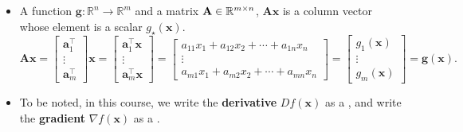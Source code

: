 \documentclass[12pt,thmsa]{article}
\begin{document}
\begin{itemize}
	\item A function \(\boldsymbol{g}: \mathbb{R}^{n} \rightarrow \mathbb{R}^{m}\) and a matrix \(\mathbf{A} \in \mathbb{R}^{\color{black}{m} \times \color{black}{n}} \), \( \mathbf{A} \boldsymbol{x} \) is a column vector whose element is a scalar \(g_{\star}(\boldsymbol{x})\). 
	\[ \mathbf{A} \boldsymbol{x}
	=\left[
	\begin{array}{c}{\boldsymbol{a}_{1}^{\top}} \\ {\vdots} \\ {\boldsymbol{a}_{m}^{\top}}\end{array}
	\right] \boldsymbol{x}
	=\left[
	\begin{array}{c}{
			\boldsymbol{a}_{1}^{\top} \boldsymbol{x}} \\ 
		{\vdots} \\ 
		{\boldsymbol{a}_{m}^{\top}\boldsymbol{x}}
	\end{array}
	\right]
	=\left[
	\begin{array}{c}{
		\boxed{ a_{11} x_{1}+a_{12} x_{2}+\cdots+a_{1 n} x_{n}} } \\ 
		{\vdots} \\ 
		\boxed{ {a_{m 1} x_{1}+a_{m 2} x_{2}+\cdots+a_{m n} x_{n}} }
	\end{array}
	\right]
	=\left[
	\begin{array}{c}{
			g_{1}(\boldsymbol{x})} \\ 
		{\vdots} \\ 
		{g_{m}(\boldsymbol{x})}
	\end{array}
	\right]
	= \boldsymbol{g}(\boldsymbol{x}).
	\]

	\item To be noted, in this course, we write the \textbf{derivative} \(D f(\boldsymbol{x}) \) as a {\color{red}{row vector}}, and write the \textbf{gradient} \( \nabla f(\boldsymbol{x}) \) as a {\color{blue}{column vector}}.
		
\end{itemize}

\newpage
\end{document}
